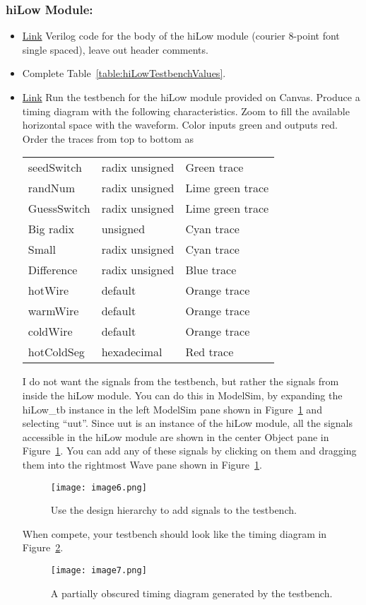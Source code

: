 \subsubsection{hiLow Module:}

\begin{itemize}
\item
  \protect\hyperlink{hilow-module}{Link} Verilog code for the body of
  the hiLow module (courier 8-point font single spaced), leave out
  header comments.
\item
  Complete Table~\ref{table:hiLowTestbenchValues}.
\item
  \protect\hyperlink{hilow_tb-module}{Link} Run the testbench for the
  hiLow module provided on Canvas. Produce a timing diagram with the
  following characteristics. Zoom to fill the available horizontal space
  with the waveform. Color inputs green and outputs red. Order the
  traces from top to bottom as

  \begin{tabular}{p{4cm}p{4cm}p{4cm}}
    seedSwitch  & radix unsigned & Green trace \\
    randNum  & radix unsigned  & Lime green trace \\
    GuessSwitch  & radix unsigned  & Lime green trace \\
    Big radix  & unsigned &  Cyan trace \\
    Small  & radix unsigned &  Cyan trace \\
    Difference  & radix unsigned &  Blue trace \\
    hotWire  & default &  Orange trace \\
    warmWire  & default &  Orange trace \\
    coldWire  & default &  Orange trace \\
    hotColdSeg  & hexadecimal &  Red trace \\
\end{tabular}

I do not want the signals from the testbench, but rather the signals
from inside the hiLow module. You can do this in ModelSim, by expanding
the hiLow\_tb instance in the left ModelSim pane shown in Figure~\ref{fig:hierarchyTestbench} and
selecting ``uut''. Since uut is an instance of the hiLow module, all the
signals accessible in the hiLow module are shown in the center Object
pane in Figure~\ref{fig:hierarchyTestbench}. You can add any of these signals by clicking on them
and dragging them into the rightmost Wave pane shown in Figure~\ref{fig:hierarchyTestbench}.

\begin{figure}
\texttt{[image:  image6.png]}
\caption{Use the design hierarchy to add signals to the testbench.}
\label{fig:hierarchyTestbench}
\end{figure}

When compete, your testbench should look like the timing diagram in
Figure~\ref{fig:guessTiming}.

\begin{figure}
\texttt{[image:  image7.png]}
\caption{A partially obscured timing diagram generated by the testbench.}
\label{fig:guessTiming}
\end{figure}
\end{itemize}

